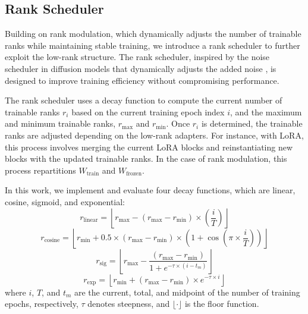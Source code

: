 \subsection{Rank Scheduler}

Building on rank modulation, which dynamically adjusts the number of trainable ranks while maintaining stable training, we introduce a rank scheduler to further exploit the low-rank structure. The rank scheduler, inspired by the noise scheduler in diffusion models that dynamically adjusts the added noise \cite{ho2020denoising}, is designed to improve training efficiency without compromising performance.

The rank scheduler uses a decay function to compute the current number of trainable ranks $r_i$ based on the current training epoch index $i$, and the maximum and minimum trainable ranks, $r_{\text{max}}$ and $r_{\text{min}}$. Once $r_i$ is determined, the trainable ranks are adjusted depending on the low-rank adapters. For instance, with LoRA, this process involves merging the current LoRA blocks and reinstantiating new blocks with the updated trainable ranks. In the case of rank modulation, this process repartitions $W_{\text{train}}$ and $W_{\text{frozen}}$.

In this work, we implement and evaluate four decay functions, which are linear, cosine, sigmoid, and exponential:
$$
r_{\text{linear}} = \left\lfloor r_{\text{max}} - (r_{\text{max}} - r_{\text{min}}) \times \left(\frac{i}{T}\right) \right\rfloor
$$
$$
r_{\text{cosine}} = \left\lfloor r_{\text{min}} + 0.5 \times (r_{\text{max}} - r_{\text{min}}) \times \left(1 + \cos\left(\pi \times \frac{i}{T}\right)\right) \right\rfloor
$$
$$
r_{\text{sig}} = \left\lfloor r_{\text{max}} - \frac{(r_{\text{max}} - r_{\text{min}})}{1 + e^{-\tau \times (i - t_{m})}} \right\rfloor 
$$
$$
r_{\text{exp}} = \left\lfloor r_{\text{min}} + (r_{\text{max}} - r_{\text{min}}) \times e^{-\tau \times i} \right\rfloor
$$
where $i$, $T$, and $t_m$ are the current, total, and midpoint of the number of training epochs, respectively, $\tau$ denotes steepness, and $\lfloor\cdot\rfloor$ is the floor function. 

\label{sec:rank_scheduler}


















